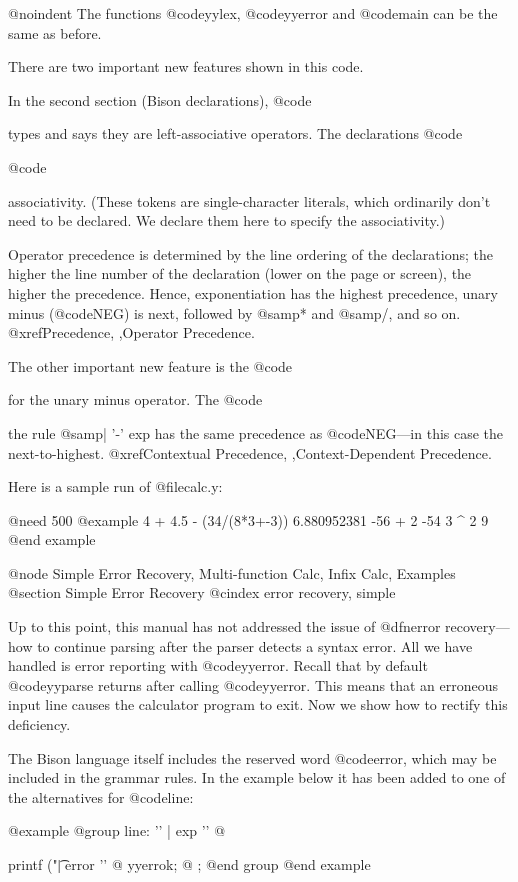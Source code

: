 {{{{@noindent
The functions @code{yylex}, @code{yyerror} and @code{main} can be the same
as before.

There are two important new features shown in this code.

In the second section (Bison declarations), @code{%
types and says they are left-associative operators.  The declarations
@code{%
@code{%
associativity.  (These tokens are single-character literals, which
ordinarily don't need to be declared.  We declare them here to specify
the associativity.)

Operator precedence is determined by the line ordering of the
declarations; the higher the line number of the declaration (lower on
the page or screen), the higher the precedence.  Hence, exponentiation
has the highest precedence, unary minus (@code{NEG}) is next, followed
by @samp{*} and @samp{/}, and so on.  @xref{Precedence, ,Operator Precedence}.

The other important new feature is the @code{%
for the unary minus operator.  The @code{%
the rule @samp{| '-' exp} has the same precedence as @code{NEG}---in this
case the next-to-highest.  @xref{Contextual Precedence, ,Context-Dependent Precedence}.

Here is a sample run of @file{calc.y}:

@need 500
@example
4 + 4.5 - (34/(8*3+-3))
6.880952381
-56 + 2
-54
3 ^ 2
9
@end example

@node Simple Error Recovery, Multi-function Calc, Infix Calc, Examples
@section Simple Error Recovery
@cindex error recovery, simple

Up to this point, this manual has not addressed the issue of @dfn{error
recovery}---how to continue parsing after the parser detects a syntax
error.  All we have handled is error reporting with @code{yyerror}.  Recall
that by default @code{yyparse} returns after calling @code{yyerror}.  This
means that an erroneous input line causes the calculator program to exit.
Now we show how to rectify this deficiency.

The Bison language itself includes the reserved word @code{error}, which
may be included in the grammar rules.  In the example below it has
been added to one of the alternatives for @code{line}:

@example
@group
line:     '\n'
        | exp '\n'   @{ printf ("\t%
        | error '\n' @{ yyerrok;                  @}
;
@end group
@end example

}}}}}}}}}}
